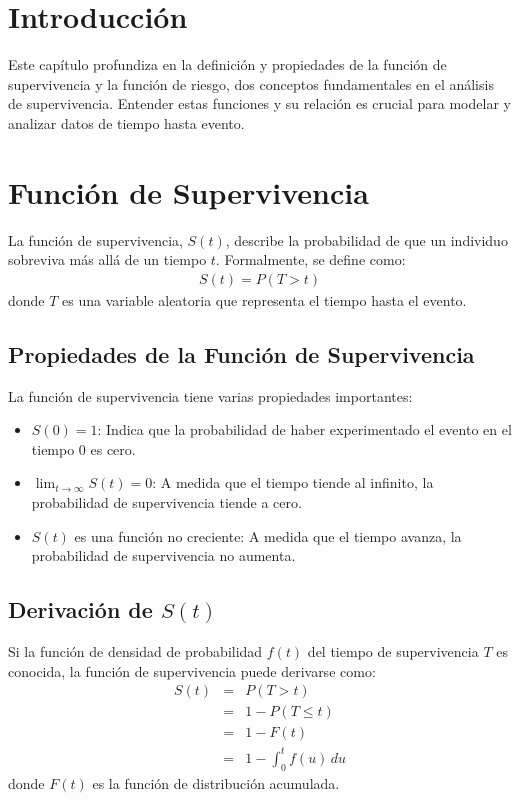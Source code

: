\section{Introducci\'on}
Este cap\'itulo profundiza en la definici\'on y propiedades de la funci\'on de supervivencia y la funci\'on de riesgo, dos conceptos fundamentales en el análisis de supervivencia. Entender estas funciones y su relaci\'on es crucial para modelar y analizar datos de tiempo hasta evento.

\section{Funci\'on de Supervivencia}
La funci\'on de supervivencia, $S(t)$, describe la probabilidad de que un individuo sobreviva más allá de un tiempo $t$. Formalmente, se define como:
\begin{eqnarray*}
S(t) = P(T > t)
\end{eqnarray*}
donde $T$ es una variable aleatoria que representa el tiempo hasta el evento.

\subsection{Propiedades de la Funci\'on de Supervivencia}
La funci\'on de supervivencia tiene varias propiedades importantes:
\begin{itemize}
    \item $S(0) = 1$: Indica que la probabilidad de haber experimentado el evento en el tiempo 0 es cero.
    \item $\lim_{t \to \infty} S(t) = 0$: A medida que el tiempo tiende al infinito, la probabilidad de supervivencia tiende a cero.
    \item $S(t)$ es una funci\'on no creciente: A medida que el tiempo avanza, la probabilidad de supervivencia no aumenta.
\end{itemize}

\subsection{Derivaci\'on de $S(t)$}
Si la funci\'on de densidad de probabilidad $f(t)$ del tiempo de supervivencia $T$ es conocida, la funci\'on de supervivencia puede derivarse como:
\begin{eqnarray*}
S(t) &=& P(T > t) \\
     &=& 1 - P(T \leq t) \\
     &=& 1 - F(t) \\
     &=& 1 - \int_0^t f(u) \, du
\end{eqnarray*}
donde $F(t)$ es la funci\'on de distribuci\'on acumulada.

